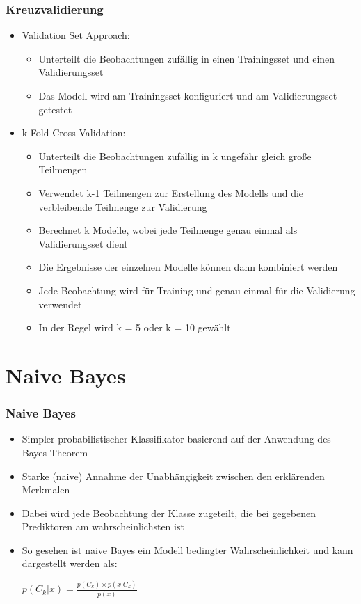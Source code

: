 \documentclass{beamer}
\begin{document}
\begin{frame}
  \frametitle{Kreuzvalidierung} 
  \begin{itemize}
   \item Validation Set Approach: 
   \begin{itemize}
  \item Unterteilt die Beobachtungen zufällig in einen Trainingsset und einen Validierungsset
  \item Das Modell wird am Trainingsset konfiguriert und am Validierungsset getestet
  \end{itemize}    
  \item k-Fold Cross-Validation: 
     \begin{itemize}
  \item Unterteilt die Beobachtungen zufällig in k ungefähr gleich große Teilmengen
  \item Verwendet k-1 Teilmengen zur Erstellung des Modells und die verbleibende Teilmenge zur Validierung
  \item Berechnet k Modelle, wobei jede Teilmenge genau einmal als Validierungsset dient
  \item Die Ergebnisse der einzelnen Modelle können dann kombiniert werden
  \item Jede Beobachtung wird für Training und genau einmal für die Validierung verwendet
  \item In der Regel wird k = 5 oder k = 10 gewählt
  \end{itemize}  
  \end{itemize}  
\end{frame}

\section{Naive Bayes}

\begin{frame}
  \frametitle{Naive Bayes}  
  \begin{itemize}
  \item Simpler probabilistischer Klassifikator basierend auf der Anwendung des Bayes Theorem
  \item Starke (naive) Annahme der Unabhängigkeit zwischen den erklärenden Merkmalen
  \item Dabei wird jede Beobachtung der Klasse zugeteilt, die bei gegebenen Prediktoren am wahrscheinlichsten ist
  \item So gesehen ist naive Bayes ein Modell bedingter Wahrscheinlichkeit und kann dargestellt werden als:
  \newline
   \begin{center}
   $p(C_{k}|x) = \frac{p(C_{k}) \times p(x|C_{k})}{p(x)}$
   \end{center}
  \end{itemize}  
\end{frame}
\end{document}
